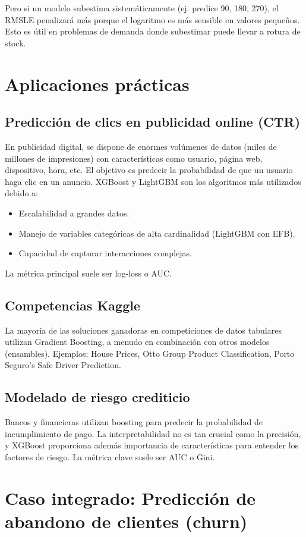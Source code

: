 \documentclass[12pt,a4paper,openany,oneside]{book}
\begin{document}
Pero si un modelo subestima sistemáticamente (ej. predice 90, 180, 270), el RMSLE penalizará más porque el logaritmo es más sensible en valores pequeños. Esto es útil en problemas de demanda donde subestimar puede llevar a rotura de stock.

\section{Aplicaciones prácticas}

\subsection{Predicción de clics en publicidad online (CTR)}
En publicidad digital, se dispone de enormes volúmenes de datos (miles de millones de impresiones) con características como usuario, página web, dispositivo, hora, etc. El objetivo es predecir la probabilidad de que un usuario haga clic en un anuncio. XGBoost y LightGBM son los algoritmos más utilizados debido a:
\begin{itemize}
    \item Escalabilidad a grandes datos.
    \item Manejo de variables categóricas de alta cardinalidad (LightGBM con EFB).
    \item Capacidad de capturar interacciones complejas.
\end{itemize}
La métrica principal suele ser log-loss o AUC.

\subsection{Competencias Kaggle}
La mayoría de las soluciones ganadoras en competiciones de datos tabulares utilizan Gradient Boosting, a menudo en combinación con otros modelos (ensambles). Ejemplos: House Prices, Otto Group Product Classification, Porto Seguro’s Safe Driver Prediction.

\subsection{Modelado de riesgo crediticio}
Bancos y financieras utilizan boosting para predecir la probabilidad de incumplimiento de pago. La interpretabilidad no es tan crucial como la precisión, y XGBoost proporciona además importancia de características para entender los factores de riesgo. La métrica clave suele ser AUC o Gini.

\section{Caso integrado: Predicción de abandono de clientes (churn)}
\end{document}
